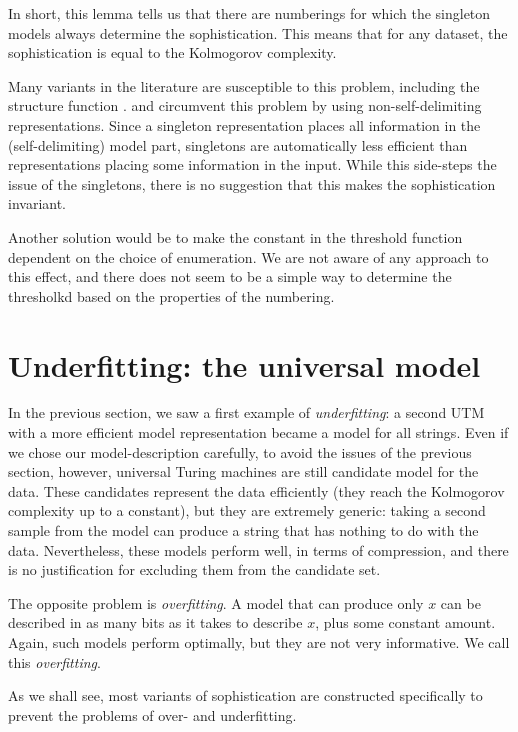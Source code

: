 \documentclass{style/llncs}
\begin{document}
In short, this lemma tells us that there are numberings for which the singleton models always determine the sophistication. This means that for any dataset, the sophistication is equal to the Kolmogorov complexity. 

Many variants in the literature are susceptible to this problem, including the structure function \cite{cover1985kolmogorov,gacs2001algorithmic}. \cite{vitanyi2004meaningful} and \cite{adriaans2012facticity} circumvent this problem by using non-self-delimiting representations. Since a singleton representation places all information in the (self-delimiting) model part, singletons are automatically less efficient than representations placing some information in the input. While this side-steps the issue of the singletons, there is no suggestion that this makes the sophistication invariant.

Another solution would be to make the constant in the threshold function dependent on the choice of enumeration. We are not aware of any approach to this effect, and there does not seem to be a simple way to determine the thresholkd based on the properties of the numbering.

\section{Underfitting: the universal model}

In the previous section, we saw a first example of \emph{underfitting}: a second UTM with a more efficient model representation became a model for all strings. Even if we chose our model-description carefully, to avoid the issues of the previous section, however, universal Turing machines are still candidate model for the data. These candidates represent the data efficiently (they reach the Kolmogorov complexity up to a constant), but they are extremely generic: taking a second sample from the model can produce a string that has nothing to do with the data. Nevertheless, these models perform well, in terms of compression, and there is no justification for excluding them from the candidate set.

The opposite problem is \emph{overfitting}. A model that can produce only $x$ can be described in as many bits as it takes to describe $x$, plus some constant amount. Again, such models perform optimally, but they are not very informative. We call this \emph{overfitting}.

As we shall see, most variants of sophistication are constructed specifically to prevent the problems of over- and underfitting.
\end{document}
